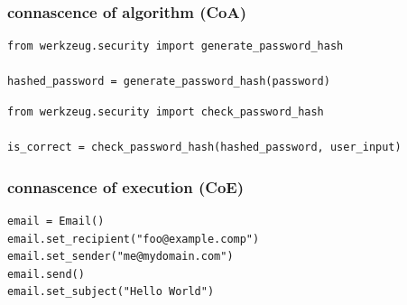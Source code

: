 \documentclass[aspectratio=169,12pt,xcolor=dvipsnames]{beamer}
\begin{document}
\begin{frame}[fragile]
  \frametitle{connascence of algorithm (CoA)}
  \begin{center}
    \begin{minipage}[c]{.98\textwidth}
      \begin{verbatim}
from werkzeug.security import generate_password_hash

hashed_password = generate_password_hash(password)
      \end{verbatim}
    \end{minipage}
    \begin{minipage}[c]{.98\textwidth}
      \begin{verbatim}
from werkzeug.security import check_password_hash

is_correct = check_password_hash(hashed_password, user_input)
      \end{verbatim}
    \end{minipage}
  \end{center}
\end{frame}

\begin{frame}[fragile]
  \frametitle{connascence of execution (CoE)}
  \begin{center}
    \begin{minipage}[c]{.62\textwidth}
      \begin{verbatim}
email = Email()
email.set_recipient("foo@example.comp")
email.set_sender("me@mydomain.com")
email.send()
email.set_subject("Hello World")
      \end{verbatim}
    \end{minipage}
  \end{center}
\end{frame}


\end{document}
